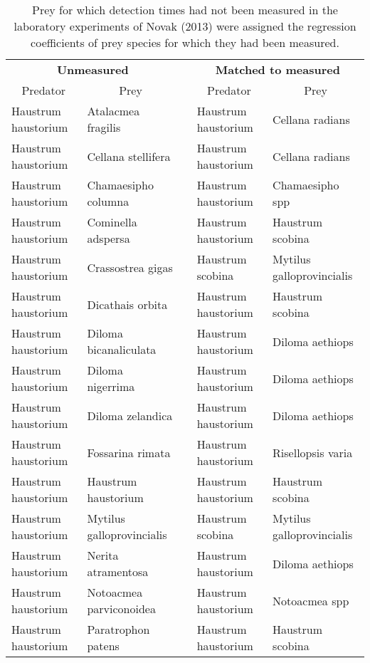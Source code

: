 \begin{table}[!htbp]
\caption{Prey for which detection times had not been measured in the laboratory experiments of Novak (2013) were assigned the regression coefficients of prey species for which they had been measured.\label{tab:matches}} 
\begin{center}
\begin{tabular}{llcll}
\hline
\multicolumn{2}{c}{\bfseries Unmeasured}&\multicolumn{1}{c}{\bfseries }&\multicolumn{2}{c}{\bfseries Matched to measured}\tabularnewline
\cline{1-2} \cline{4-5}
\multicolumn{1}{c}{Predator}&\multicolumn{1}{c}{Prey}&\multicolumn{1}{c}{}&\multicolumn{1}{c}{Predator}&\multicolumn{1}{c}{Prey}\tabularnewline
\hline
Haustrum haustorium&Atalacmea fragilis&&Haustrum haustorium&Cellana radians\tabularnewline
Haustrum haustorium&Cellana stellifera&&Haustrum haustorium&Cellana radians\tabularnewline
Haustrum haustorium&Chamaesipho columna&&Haustrum haustorium&Chamaesipho spp\tabularnewline
Haustrum haustorium&Cominella adspersa&&Haustrum haustorium&Haustrum scobina\tabularnewline
Haustrum haustorium&Crassostrea gigas&&Haustrum scobina&Mytilus galloprovincialis\tabularnewline
Haustrum haustorium&Dicathais orbita&&Haustrum haustorium&Haustrum scobina\tabularnewline
Haustrum haustorium&Diloma bicanaliculata&&Haustrum haustorium&Diloma aethiops\tabularnewline
Haustrum haustorium&Diloma nigerrima&&Haustrum haustorium&Diloma aethiops\tabularnewline
Haustrum haustorium&Diloma zelandica&&Haustrum haustorium&Diloma aethiops\tabularnewline
Haustrum haustorium&Fossarina rimata&&Haustrum haustorium&Risellopsis varia\tabularnewline
Haustrum haustorium&Haustrum haustorium&&Haustrum haustorium&Haustrum scobina\tabularnewline
Haustrum haustorium&Mytilus galloprovincialis&&Haustrum scobina&Mytilus galloprovincialis\tabularnewline
Haustrum haustorium&Nerita atramentosa&&Haustrum haustorium&Diloma aethiops\tabularnewline
Haustrum haustorium&Notoacmea parviconoidea&&Haustrum haustorium&Notoacmea spp\tabularnewline
Haustrum haustorium&Paratrophon patens&&Haustrum haustorium&Haustrum scobina\tabularnewline

\end{tabular}
\end{center}
\end{table}
